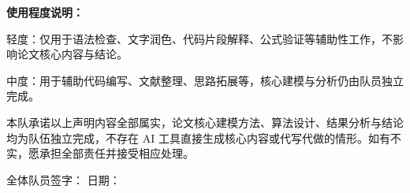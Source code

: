 \documentclass[12pt,a4paper]{ctexart}
\numberwithin{equation}{section}
\begin{document}
\textbf{使用程度说明：}

轻度：仅用于语法检查、文字润色、代码片段解释、公式验证等辅助性工作，不影响论文核心内容与结论。

中度：用于辅助代码编写、文献整理、思路拓展等，核心建模与分析仍由队员独立完成。

本队承诺以上声明内容全部属实，论文核心建模方法、算法设计、结果分析与结论均为队伍独立完成，不存在 AI 工具直接生成核心内容或代写代做的情形。如有不实，愿承担全部责任并接受相应处理。

\vspace{1em}
\noindent 全体队员签字：\underline{\hspace{4cm}} \hfill 日期：\underline{\hspace{3cm}}
\end{document}
